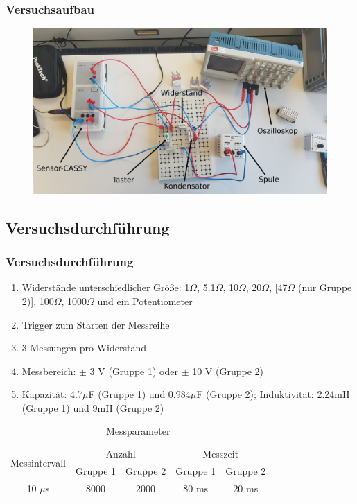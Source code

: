\documentclass{beamer}
\begin{document}
\begin{frame}
\frametitle{Versuchsaufbau}
\begin{figure}
\includegraphics[width=\linewidth]{abbildungen/LCR_aufbau_beschriftet.jpg}
\end{figure}
\end{frame}


\subsection{Versuchsdurchführung}

\begin{frame}
\frametitle{Versuchsdurchführung}

\begin{enumerate}[-]
\item Widerstände unterschiedlicher Größe: 1$\Omega$, 5.1$\Omega$, 10$\Omega$, 20$\Omega$, [47$\Omega$ (nur Gruppe 2)], 100$\Omega$, 1000$\Omega$ und ein Potentiometer
\item Trigger zum Starten der Messreihe
\item 3 Messungen pro Widerstand
\item Messbereich: $\pm$ 3 V (Gruppe 1) oder $\pm$ 10 V (Gruppe 2)
\item Kapazität: 4.7$\mu$F (Gruppe 1) und 0.984$\mu$F (Gruppe 2); Induktivität: 2.24mH (Gruppe 1) und 9mH (Gruppe 2)
\end{enumerate}

\begin{table}
\begin{tabular}{|c|c|c|c|c|}
\hline
\multirow{2}{*}{Messintervall} & \multicolumn{2}{c|}{Anzahl} & \multicolumn{2}{c|}{Messzeit} \\
\cline{2-5}
& Gruppe 1 & Gruppe 2 & Gruppe 1 & Gruppe 2 \\
\hline
10 $\mu$s & 8000 & 2000 & 80 ms & 20 ms \\
\hline
\end{tabular}
\caption{Messparameter}
\end{table}
\end{frame}
\end{document}
